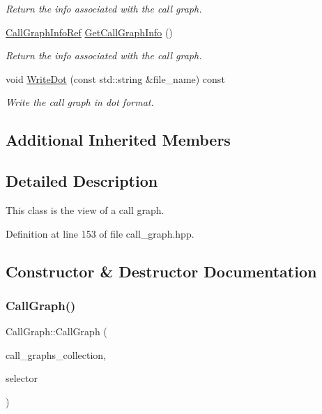 \begin{DoxyCompactItemize}
\begin{DoxyCompactList}\small\item\em Return the info associated with the call graph. \end{DoxyCompactList}\item 
\hyperlink{call__graph_8hpp_a3259d849c69d9d111ec0c5178d9b32af}{Call\+Graph\+Info\+Ref} \hyperlink{classCallGraph_a211db8d8f8ff5698449bb0658ac22fd5}{Get\+Call\+Graph\+Info} ()
\begin{DoxyCompactList}\small\item\em Return the info associated with the call graph. \end{DoxyCompactList}\item 
void \hyperlink{classCallGraph_a6e287e497ccea0c37060292271c0c118}{Write\+Dot} (const std\+::string \&file\+\_\+name) const
\begin{DoxyCompactList}\small\item\em Write the call graph in dot format. \end{DoxyCompactList}\end{DoxyCompactItemize}
\subsection*{Additional Inherited Members}


\subsection{Detailed Description}
This class is the view of a call graph. 

Definition at line 153 of file call\+\_\+graph.\+hpp.



\subsection{Constructor \& Destructor Documentation}
\mbox{\label{classCallGraph_a47b6528866d0e92350674d18285704c1}} 
\subsubsection{\texorpdfstring{Call\+Graph()}{CallGraph()}\hspace{0.1cm}{\footnotesize\ttfamily [1/2]}}
{\footnotesize\ttfamily Call\+Graph\+::\+Call\+Graph (\begin{DoxyParamCaption}\item[{const \hyperlink{call__graph_8hpp_afccdc7a00d60cb4ee70f44b223f858bb}{Call\+Graphs\+Collection\+Ref}}]{call\+\_\+graphs\+\_\+collection,  }\item[{const int}]{selector }\end{DoxyParamCaption})}



